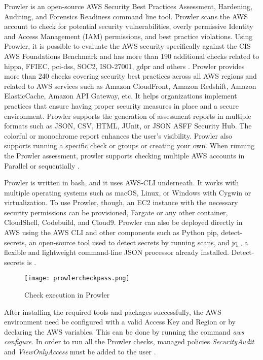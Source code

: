 \hfill \break
\par Prowler is an open-source AWS Security Best Practices Assessment, Hardening, Auditing, and Forensics Readiness command line tool.
Prowler scans the AWS account to check for potential security vulnerabilities, overly permissive Identity and Access Management (IAM) permissions, and best practice violations.
Using Prowler, it is possible to evaluate the AWS
security specifically against the CIS AWS Foundations
Benchmark and has more than 190 additional checks related
to \gls{hippa}, FFIEC, \gls{pci-dss}, SOC2, ISO-27001,
\gls{gdpr}
and
others \cite{49}.
Prowler provides more than 240 checks covering security best practices across all AWS regions and related to AWS services such as Amazon CloudFront, Amazon Redshift, Amazon ElasticCache, Amazon API Gateway, etc.
It helps organizations implement practices that ensure
having proper security measures in place and a secure
environment.
Prowler supports the generation of assessment reports in multiple formats such as JSON, CSV, HTML, JUnit, or JSON ASFF Security Hub.
The colorful or monochrome report enhances the user’s visibility.
Prowler also supports running a specific check or groups or creating your own.
When running the Prowler assessment, prowler supports
checking multiple AWS accounts in Parallel or
sequentially \cite{50}.\\
\hfill \break
\par Prowler is written in bash, and it uses AWS-CLI
underneath.
It works with multiple operating systems such
as macOS, Linux, or Windows with Cygwin or virtualization.
To use Prowler, though, an EC2 instance with the necessary security permissions can be provisioned, Fargate or any other container, CloudShell, Codebuild, and Cloud9.
Prowler can also be deployed directly in AWS using the AWS
CLI and other components such as Python pip,
detect-secrets, an open-source tool used to detect secrets by running scans, and jq , a flexible and lightweight command-line JSON processor already installed.
Detect-secrets is  \cite{50}.
\hfill \break
\begin{figure}
    \centering
    \texttt{[image: prowlercheckpass.png]}
    \caption{Check execution in Prowler}
    \label{fig:prowlercheckexecution}
\end{figure}

\par After installing the required tools and packages
successfully, the AWS environment need be configured with
a valid Access Key and Region or by declaring the AWS
variables.
This can be done by running the command \textit{aws configure}.
In order to run all the Prowler checks, managed policies
\textit{SecurityAudit} and \textit{ViewOnlyAccess} must
be added to the user \cite{47}.



